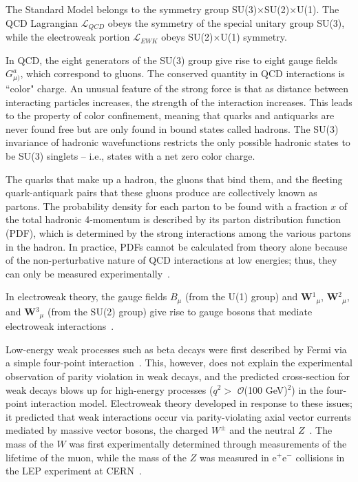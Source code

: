 The Standard Model belongs to the symmetry group SU(3)$\times$SU(2)$\times$U(1). The QCD Lagrangian $\mathcal{L}_{QCD}$ obeys the symmetry of the special unitary group SU(3), while the electroweak portion $\mathcal{L}_{EWK}$ obeys SU(2)$\times$U(1) symmetry.

In QCD, the eight generators of the SU(3) group give rise to eight gauge fields $G^{a}_{\mu)}$, which correspond to gluons. The conserved quantity in QCD interactions is ``color" charge. An unusual feature of the strong force is that as distance between interacting particles increases, the strength of the interaction increases. This leads to the property of color confinement, meaning that quarks and antiquarks are never found free but are only found in bound states called hadrons. The SU(3) invariance of hadronic wavefunctions restricts the only possible hadronic states to be SU(3) singlets -- i.e., states with a net zero color charge.

The quarks that make up a hadron, the gluons that bind them, and the fleeting quark-antiquark pairs that these gluons produce are collectively known as partons. The probability density for each parton to be found with a fraction $x$ of the total hadronic 4-momentum is described by its parton distribution function (PDF), which is determined by the strong interactions among the various partons in the hadron. In practice, PDFs cannot be calculated from theory alone because of the non-perturbative nature of QCD interactions at low energies; thus, they can only be measured experimentally~\cite{BettiniPhysics}.

In electroweak theory, the gauge fields $B_{\mu}$ (from the U(1) group) and \textbf{W}$^1$$_{\mu}$, \textbf{W}$^2$$_{\mu}$, and \textbf{W}$^3$$_{\mu}$ (from the SU(2) group) give rise to gauge bosons that mediate electroweak interactions~\cite{Bednyakov:2007pz}.

Low-energy weak processes such as beta decays were first described by Fermi via a simple four-point interaction~\cite{0034-4885-42-12-001}. This, however, does not explain the experimental observation of parity violation in weak decays, and the predicted cross-section for weak decays blows up for high-energy processes ($q^2 >$ $\mathcal{O}$(100 GeV)$^2$) in the four-point interaction model. Electroweak theory developed in response to these issues; it predicted that weak interactions occur via parity-violating axial vector currents mediated by massive vector bosons, the charged $W^{\pm}$ and the neutral $Z$~\cite{PerkinsPhysics}. The mass of the $W$ was first experimentally determined through measurements of the lifetime of the muon, while the mass of the $Z$ was measured in e$^{+}$e$^{-}$ collisions in the LEP experiment at CERN~\cite{ThomsonPhysics}.

